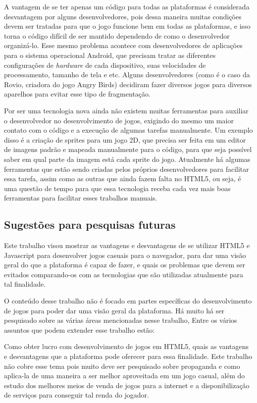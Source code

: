 A vantagem de se ter apenas um código para todas as plataformas é
considerada desvantagem por alguns desenvolvedores, pois dessa maneira
muitas condições devem ser tratadas para que o jogo funcione bem em
todas as plataformas, e isso torna o código difícil de ser mantido
dependendo de como o desenvolvedor organizá-lo.
Esse mesmo problema acontece com desenvolvedores de aplicações para o
sistema operacional Android, que precisam tratar as diferentes
configurações de \textit{hardware} de cada dispositivo, suas
velocidades de processamento, tamanho de tela e etc. Alguns
desenvolvedores (como é o caso da Rovio, criadora do jogo Angry Birds)
decidiram fazer diversos jogos para diversos aparelhos para evitar
esse tipo de fragmentação.

Por ser uma tecnologia nova ainda não existem muitas ferramentas para
auxiliar o desenvolvedor no desenvolvimento de jogos, exigindo do
mesmo um maior contato com o código e a execução de algumas tarefas
manualmente. Um exemplo disso é a criação de sprites para um jogo 2D,
que precisa ser feita em um editor de imagens padrão e mapeada
manualmente para o código, para que seja possível saber em qual parte
da imagem está cada sprite do jogo.
Atualmente há algumas ferramentas que estão sendo criadas pelos
próprios desenvolvedores para facilitar essa tarefa, assim como as
outras que ainda fazem falta no HTML5, ou seja, é uma questão de tempo
para que essa tecnologia receba cada vez mais boas ferramentas para
facilitar esses trabalhos manuais.

\subsection{Sugestões para pesquisas futuras}

Este trabalho visou mostrar as vantagens e desvantagens de se utilizar
HTML5 e Javascript para desenvolver jogos casuais para o navegador,
para dar uma visão geral do que a plataforma é capaz de fazer, e quais
os problemas que devem ser evitados comparando-os com as tecnologias
que são utilizadas atualmente para tal finalidade.

O conteúdo desse trabalho não é focado em partes específicas do
desenvolvimento de jogos para poder dar uma visão geral da plataforma.
Há muito há ser pesquisado sobre as várias áreas mencionadas nesse
trabalho, Entre os vários assuntos que podem extender esse trabalho
estão:

Como obter lucro com desenvolvimento de jogos em HTML5, quais as vantagens
e desvantagens que a plataforma pode oferecer para essa
finalidade. Este trabalho não cobre esse tema pois muito deve ser
pesquisado sobre propaganda e como aplica-la de uma maneira a ser
melhor aproveitada em um jogo casual, além do estudo dos melhores
meios de venda de jogos para a internet e a disponibilização de
serviços para conseguir tal renda do jogador.


